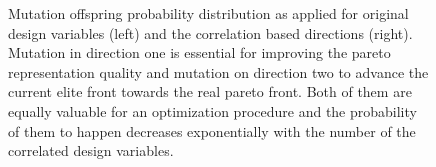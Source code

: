 \begin{figure}[h!]
\begin{minipage}[b]{0.5\linewidth}
 \centering
\end{minipage}
\begin{minipage}[b]{0.5\linewidth}
 \centering
\end{minipage}
\caption{Mutation offspring probability distribution as applied for original design variables (left) and the correlation based directions (right). Mutation in direction one is essential for improving the pareto representation quality and mutation on direction two to advance the current elite front towards the real pareto front. Both of them are equally valuable for an optimization procedure and the probability of them to happen decreases exponentially with the number of the correlated design variables.}
\label{mut}
\end{figure}



